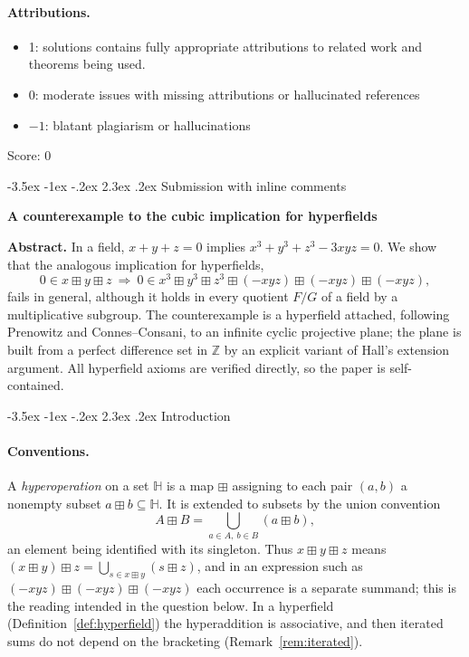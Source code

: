 \documentclass[11pt]{article}
\makeatletter
\renewcommand\section{\@startsection{section}{1}{\z@}
  {-3.5ex \@plus -1ex \@minus -.2ex}
  {2.3ex \@plus.2ex}
  {\normalfont\bfseries}}
\theoremstyle{plain}
\theoremstyle{definition}
\newcommand{\Z}{\mathbb{Z}}
\newcommand{\Hh}{\mathbb{H}}
\newcommand{\bp}{\boxplus}
\makeatother
\begin{document}
\paragraph{Attributions.}
\begin{itemize}
	\item  1: solutions contains fully appropriate attributions
		to related work and theorems being used.
	\item  0: moderate issues with missing attributions or hallucinated references
	\item  $-1$: blatant plagiarism or hallucinations
\end{itemize}

\noindent Score: 0

\newpage
\section{Submission with inline comments}


\begin{center}
{\textbf{A counterexample to the cubic implication for hyperfields}}
\end{center}

\medskip
\noindent\textbf{Abstract.}
In a field, $x+y+z=0$ implies $x^3+y^3+z^3-3xyz=0$.  We show that the
analogous implication for hyperfields,
\[
 0\in x\bp y\bp z
 \ \Longrightarrow\
 0\in x^3\bp y^3\bp z^3\bp(-xyz)\bp(-xyz)\bp(-xyz),
\]
fails in general, although it holds in every quotient $F/G$ of a field
by a multiplicative subgroup.  The counterexample is a hyperfield
attached, following Prenowitz and Connes--Consani, to an infinite
cyclic projective plane; the plane is built from a perfect difference
set in $\Z$ by an explicit variant of Hall's extension argument.  All
hyperfield axioms are verified directly, so the paper is
self-contained.

\section{Introduction}\label{sec:intro}

\paragraph{Conventions.}
A \emph{hyperoperation} on a set $\Hh$ is a map $\bp$ assigning to each
pair $(a,b)$ a nonempty subset $a\bp b\subseteq\Hh$.  It is extended to
subsets by the union convention
\begin{equation}\label{eq:union}
 A\bp B=\bigcup_{a\in A,\ b\in B}(a\bp b),
\end{equation}
an element being identified with its singleton.  Thus
$x\bp y\bp z$ means $(x\bp y)\bp z=\bigcup_{s\in x\bp y}(s\bp z)$, and
in an expression such as $(-xyz)\bp(-xyz)\bp(-xyz)$ each occurrence is a
separate summand; this is the reading intended in the question below.
In a hyperfield (Definition~\ref{def:hyperfield}) the hyperaddition is
associative, and then iterated sums do not depend on the bracketing
(Remark~\ref{rem:iterated}).
\end{document}
